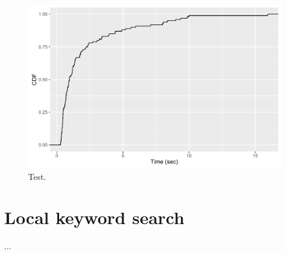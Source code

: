 \begin{figure}[!h]
	\centering
	\includegraphics[width=0.6\columnwidth]{images/experiments/cdf_remote_search_all_results}
	\caption{Test.}
	\label{fig:remote_search_all_result}
\end{figure}

\section{Local keyword search}
...

